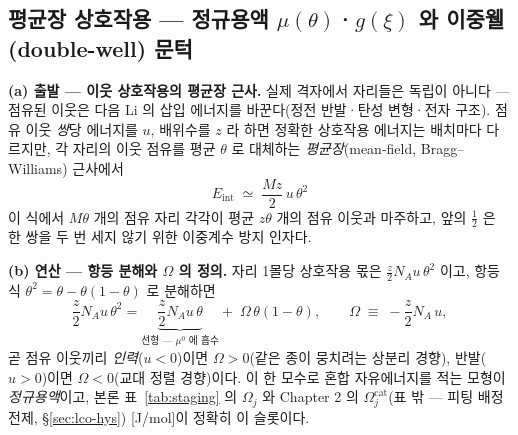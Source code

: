 \subsection{평균장 상호작용 --- 정규용액 $\mu(\theta)$·$g(\xi)$ 와 이중웰(double-well) 문턱}\label{sec:sm-mf}
\textbf{(a) 출발 --- 이웃 상호작용의 평균장 근사.} 실제 격자에서 자리들은 독립이 아니다 --- 점유된 이웃은 다음
Li 의 삽입 에너지를 바꾼다(정전 반발·탄성 변형·전자 구조). 점유 이웃 \emph{쌍}당 에너지를 $u$, 배위수를 $z$
라 하면 정확한 상호작용 에너지는 배치마다 다르지만, 각 자리의 이웃 점유를 평균 $\theta$ 로 대체하는
\emph{평균장}(mean-field, Bragg--Williams) 근사에서
\begin{equation}
E_\mathrm{int}\;\simeq\;\frac{Mz}{2}\,u\,\theta^2
\label{eq:sm-mf}
\end{equation}
이 식에서 $M\theta$ 개의 점유 자리 각각이 평균 $z\theta$ 개의 점유 이웃과 마주하고, 앞의 $\tfrac12$ 은 한 쌍을 두 번
세지 않기 위한 이중계수 방지 인자다.

\textbf{(b) 연산 --- 항등 분해와 $\Omega$ 의 정의.} 자리 1몰당 상호작용 몫은 $\tfrac{z}{2}N_Au\,\theta^2$ 이고,
항등식 $\theta^2=\theta-\theta(1-\theta)$ 로 분해하면
\begin{equation}
\frac{z}{2}N_Au\,\theta^2
=\underbrace{\frac{z}{2}N_Au\,\theta}_{\text{선형 --- }\mu^0\text{ 에 흡수}}
+\;\Omega\,\theta(1-\theta),
\qquad
\Omega\;\equiv\;-\frac{z}{2}N_A\,u,
\label{eq:sm-omega}
\end{equation}
곧 점유 이웃끼리 \emph{인력}($u<0$)이면 $\Omega>0$(같은 종이 뭉치려는 상분리 경향), 반발($u>0$)이면
$\Omega<0$(교대 정렬 경향)이다. 이 한 모수로 혼합 자유에너지를 적는 모형이
\emph{정규용액}이고, 본론 표~\ref{tab:staging} 의 $\Omega_j$ 와 Chapter 2 의
$\Omega_j^\mathrm{cat}$(표 밖 --- 피팅 배정 전제, \S\ref{sec:lco-hys}) [J/mol]이 정확히 이 슬롯이다.

